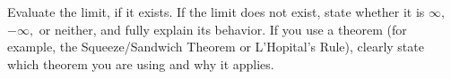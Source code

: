 \documentclass[addpoints,12pt]{exam}
\begin{document}
\begin{questions}


\question
Evaluate the limit, if it exists. If the limit does not exist, state whether it is $\infty,$ $-\infty,$ or
neither, and fully explain its behavior. If you use a theorem (for example, the Squeeze/Sandwich
Theorem or L'Hopital's Rule), clearly state which theorem you are using and why it applies.



\end{questions}
\end{document}
